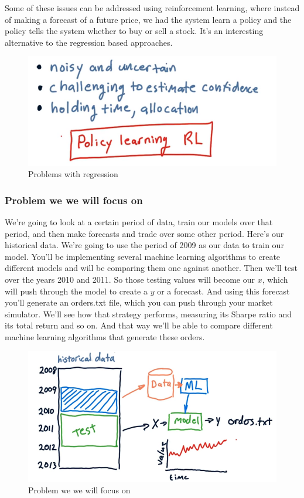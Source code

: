 \documentclass[12pt]{article}
\begin{document}
Some of these issues can be addressed using reinforcement learning, where instead of making a forecast of a future price, we had the system learn a policy and the policy tells the system whether to buy or sell a stock. It's an interesting alternative to the regression based approaches. 

\begin{figure}[!ht]
\centering
\includegraphics[scale=0.45]{fig/fig80}
\caption{Problems with regression}
\end{figure}

\subsubsection{Problem we we will focus on}

We're going to look at a certain period of data, train our models over that period, and then make forecasts and trade over some other period. Here's our historical data. We're going to use the period of 2009 as our data to train our model. You'll be implementing several machine learning algorithms to create different models and will be comparing them one against another. Then we'll test over the years 2010 and 2011. So those testing values will become our $x$, which will push through the model to create a $y$ or a forecast. And using this forecast you'll generate an orders.txt file, which you can push through your market simulator. We'll see how that strategy performs, measuring its Sharpe ratio and its total return and so on. And that way we'll be able to compare different machine learning algorithms that generate these orders. 

\begin{figure}[!ht]
\centering
\includegraphics[scale=0.45]{fig/fig81}
\caption{Problem we we will focus on}
\end{figure}
\end{document}
